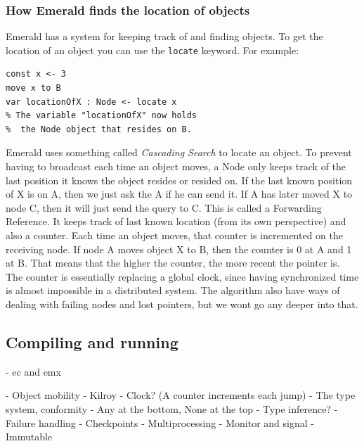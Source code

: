 \subsubsection{How Emerald finds the location of objects}
Emerald has a system for keeping track of and finding objects. To get the location of an object you can use the \verb|locate| keyword. For example:
\begin{lstlisting}[language=emerald]
const x <- 3
move x to B
var locationOfX : Node <- locate x
% The variable "locationOfX" now holds 
%  the Node object that resides on B.
\end{lstlisting}
Emerald uses something called \textit{Cascading Search} to locate an object. To prevent having to broadcast each time an object moves, a Node only keeps track of the last position it knows the object resides or resided on. If the last known position of X is on A, then we just ask the A if he can send it. If A has later moved X to node C, then it will just send the query to C. This is called a Forwarding Reference. It keeps track of last known location (from its own perspective) and also a counter. Each time an object moves, that counter is incremented on the receiving node. If node A moves object X to B, then the counter is 0 at A and 1 at B. That means that the higher the counter, the more recent the pointer is. The counter is essentially replacing a global clock, since having synchronized time is almost impossible in a distributed system. The algorithm also have ways of dealing with failing nodes and lost pointers, but we wont go any deeper into that. 




\subsection{Compiling and running}
- ec and emx

- Object mobility
    - Kilroy
    - Clock? (A counter increments each jump)
- The type system, conformity
    - Any at the bottom, None at the top
    - Type inference?
- Failure handling
- Checkpoints
- Multiprocessing
    - Monitor and signal
- Immutable




